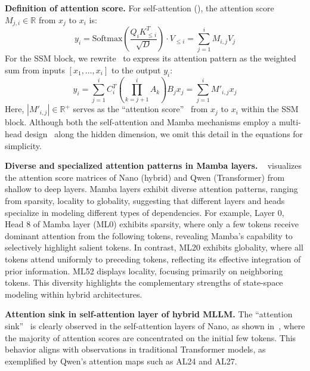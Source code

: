 \documentclass[10pt,twocolumn,letterpaper]{article}
\begin{document}
\noindent\textbf{Definition of attention score.}
For self-attention (), the attention score $M_{j,i} \in \mathbb{R}$ from $x_j$ to $x_i$ is:
\begin{equation}
        y_i = \mathrm{Softmax}(\frac{Q_iK_{\leq i}^T}{\sqrt{D}})\cdot V_{\leq i}=\sum_{j=1}^iM_{i,j} V_j
\end{equation}
For the SSM block, we rewrite~ to express its attention pattern as the weighted sum from inputs $[x_1, \dots, x_i]$ to the output $y_i$:
\begin{equation}
    y_{i} = \sum_{j=1}^i C_{i}^T (\prod_{k=j+1}^i A_{k})B_{j} x_{j} = \sum_{j=1}^iM'_{i,j} x_{j}
\end{equation}
Here, $|M'_{i,j}| \in \mathbb{R}^+$ serves as the “attention score”~\cite{ameen2025mambavis, zimerman2025mambavis} from $x_j$ to $x_i$ within the SSM block.
Although both the self-attention and Mamba mechanisms employ a multi-head design~\cite{vaswani2017attention,dao2024mamba2} along the hidden dimension, we omit this detail in the equations for simplicity.



\noindent\textbf{Diverse and specialized attention patterns in Mamba layers.} 
~ visualizes the attention score matrices of Nano (hybrid) and Qwen (Transformer) from shallow to deep layers.
Mamba layers exhibit diverse attention patterns, ranging from sparsity, locality to globality, suggesting that different layers and heads specialize in modeling different types of dependencies. 
For example, Layer 0, Head 8 of Mamba layer (ML0) exhibits sparsity, where only a few tokens receive dominant attention from the following tokens, revealing Mamba's capability to selectively highlight salient tokens.
In contrast, ML20 exhibits globality, where all tokens attend uniformly to preceding tokens, reflecting its effective integration of prior information.
ML52 displays locality, focusing primarily on neighboring tokens.
This diversity highlights the complementary strengths of state-space modeling within hybrid architectures. 


\noindent\textbf{Attention sink in self-attention layer of hybrid MLLM.} 
The ``attention sink''~\cite{xiao2024attentionsink,sun2024massive} is clearly observed in the self-attention layers of Nano, as shown in~, where the majority of attention scores are concentrated on the initial few tokens.
This behavior aligns with observations in traditional Transformer models, as exemplified by Qwen's attention maps such as AL24 and AL27.
\end{document}
